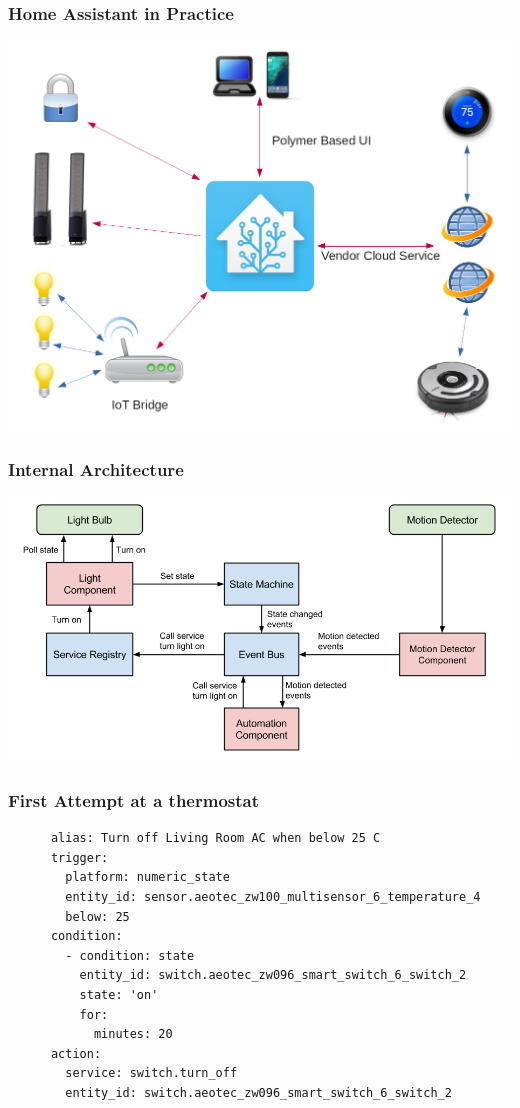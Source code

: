 \documentclass[aspectratio=169,11pt,hyperref={colorlinks=true}]{beamer}
\begin{document}
\begin{frame}
    \frametitle{Home Assistant in Practice}
    \centering
    \includegraphics[height=.95\textheight]{HA_in_practice.png}

\end{frame}

\begin{frame}
    \frametitle{Internal Architecture}
    \includegraphics[width=\textwidth]{state_machine.png}
\end{frame}

\begin{frame}[fragile=singleslide]
    \frametitle{First Attempt at a thermostat}
    \begin{verbatim}
      alias: Turn off Living Room AC when below 25 C
      trigger:
        platform: numeric_state
        entity_id: sensor.aeotec_zw100_multisensor_6_temperature_4
        below: 25
      condition:
        - condition: state
          entity_id: switch.aeotec_zw096_smart_switch_6_switch_2
          state: 'on'
          for:
            minutes: 20
      action:
        service: switch.turn_off
        entity_id: switch.aeotec_zw096_smart_switch_6_switch_2
    \end{verbatim}
\end{frame}
\end{document}
